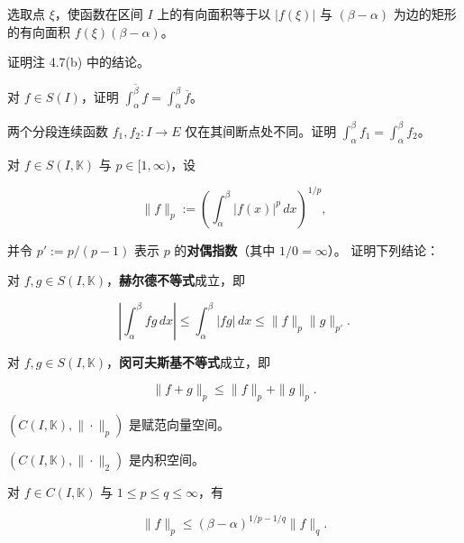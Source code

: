 选取点 $ \xi $，使函数在区间 $ I $ 上的有向面积等于以 $ \left| f(\xi) \right| $ 与 $ (\beta - \alpha) $ 为边的矩形的有向面积 $ f(\xi)(\beta - \alpha) $。

\exerciseshead

\begin{exercises}
\item

证明注 4.7(b) 中的结论。

\item

对 $ f \in S(I) $，证明 $ \overline{\int_{\alpha}^{\beta} f} = \int_{\alpha}^{\beta} \overline{f} $。

\item

两个分段连续函数 $ f_1, f_2 : I \to E $ 仅在其间断点处不同。证明 $ \int_{\alpha}^{\beta} f_1 = \int_{\alpha}^{\beta} f_2 $。

\item

对 $ f \in S(I, \mathbb{K}) $ 与 $ p \in [1, \infty) $，设

\[
\|f\|_p := \left( \int_{\alpha}^{\beta} |f(x)|^p \, dx \right)^{1/p} ,
\]

并令 $ p' := p/(p - 1) $ 表示 $ p $ 的\textbf{对偶指数}（其中 $ 1/0 = \infty $）。
证明下列结论：

\begin{subitems}
\item

对 $ f, g \in S(I, \mathbb{K}) $，\textbf{赫尔德不等式}成立，即

\[
\left| \int_{\alpha}^{\beta} f g \, dx \right| \le \int_{\alpha}^{\beta} |f g| \, dx \le \|f\|_p \|g\|_{p'} .
\]
\item

对 $ f, g \in S(I, \mathbb{K}) $，\textbf{闵可夫斯基不等式}成立，即

\[
\|f + g\|_p \le \|f\|_p + \|g\|_p .
\]
\item

$ (C(I, \mathbb{K}), \|\cdot\|_p) $ 是赋范向量空间。

\item

$ (C(I, \mathbb{K}), \|\cdot\|_2) $ 是内积空间。

\item

对 $ f \in C(I, \mathbb{K}) $ 与 $ 1 \le p \le q \le \infty $，有

\[
\|f\|_p \le (\beta - \alpha)^{1/p - 1/q} \|f\|_q .
\]


\end{subitems}
\end{exercises}
